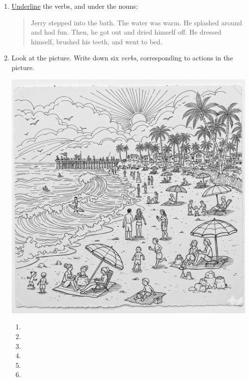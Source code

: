 \documentclass{tufte-book}
\begin{document}
\begin{enumerate}
  \item \underline{Underline} the verbs, and  under the nouns:
  \begin{quote}
    Jerry stepped into the bath. The water was warm. He splashed around and had fun.
    Then, he got out and dried himself off. He dressed himself, brushed his teeth, and went to bed.
  \end{quote}

  \item Look at the picture. Write down six \emph{verbs}, corresponding to actions in the picture.
  \begin{marginfigure}\includegraphics[width=\textwidth]{grammar/beach.png}\end{marginfigure}
  \begin{multicols}{2}
    \begin{enumerate}
      \item \dotfill\bigskip
      \item \dotfill\bigskip
      \item \dotfill
      \item \dotfill\bigskip
      \item \dotfill\bigskip
      \item \dotfill\bigskip
    \end{enumerate}
  \end{multicols}


\end{enumerate}
\end{document}
